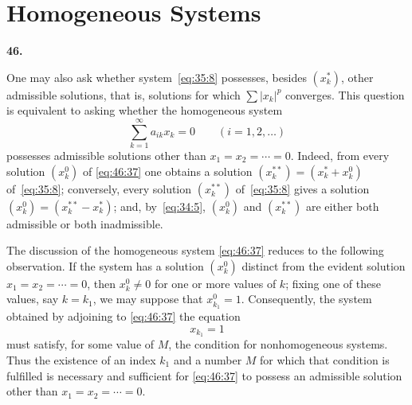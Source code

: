 \documentclass[
  paper=b5,
  fontsize=13pt,
  twoside=true,
  open=any,
  bookmarkpackage=false,
  chapterprefix=true,
  headings=normal
]{scrbook}
\theoremstyle{definition}
\newcommand{\numberedparagraph}[1]{%
  \par\medskip\phantomsection\label{sec:#1}%
  \noindent\textbf{#1.}\enspace
}
\begin{document}
\section{Homogeneous Systems}

\numberedparagraph{46}
One may also ask whether system~\eqref{eq:35:8} possesses, besides $(x_k^*)$, other
admissible solutions, that is, solutions for which $\sum|x_k|^p$ converges.
This question is equivalent to asking whether the homogeneous system
\begin{equation}
  \sum_{k=1}^{\infty}a_{ik}x_k=0\qquad(i=1,2,\ldots)
  \tag{37}\label{eq:46:37}
\end{equation}
possesses admissible solutions other than $x_1=x_2=\cdots=0$. Indeed, from
every solution $(x_k^0)$ of \eqref{eq:46:37} one obtains a solution
$(x_k^{**})=(x_k^*+x_k^0)$ of~\eqref{eq:35:8}; conversely, every solution $(x_k^{**})$
of~\eqref{eq:35:8} gives a solution $(x_k^0)=(x_k^{**}-x_k^*)$; and, by~\eqref{eq:34:5},
$(x_k^0)$ and $(x_k^{**})$ are either both admissible or both inadmissible.

The discussion of the homogeneous system \eqref{eq:46:37} reduces to the
following observation. If the system has a solution $(x_k^0)$ distinct from
the evident solution $x_1=x_2=\cdots=0$, then $x_k^0\neq0$ for one or more
values of $k$; fixing one of these values, say $k=k_1$, we may suppose that
$x_{k_1}^0=1$. Consequently, the system obtained by adjoining to
\eqref{eq:46:37} the equation
\[
  x_{k_1}=1
\]
must satisfy, for some value of $M$, the condition for nonhomogeneous
systems. Thus the existence of an index $k_1$ and a number $M$ for which
that condition is fulfilled is necessary and sufficient for
\eqref{eq:46:37} to possess an admissible solution other than
$x_1=x_2=\cdots=0$.
\end{document}
